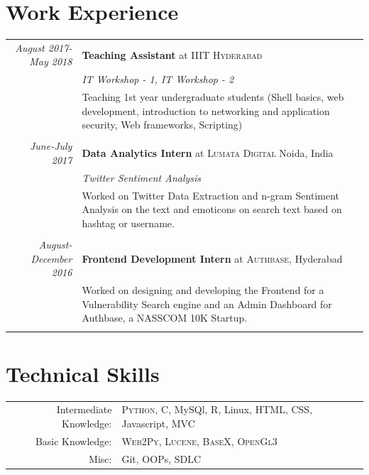 \documentclass[a4paper,10pt]{article}
\begin{document}
\section{Work Experience}
\begin{tabular}{r|p{11cm}}


 \emph{August 2017-May 2018} & \textbf{Teaching Assistant} at \textsc{IIIT Hyderabad} \\\textsc{}&\emph{IT Workshop - 1, IT Workshop - 2}\\&\footnotesize{Teaching 1st year undergraduate students (Shell basics, web
development, introduction to networking and application security, Web frameworks, Scripting)}\\\multicolumn{2}{c}{} \\
 

 \emph{June-July 2017} &\textbf{ Data Analytics Intern} at \textsc{Lumata Digital} Noida, India \\\textsc{}&\emph{Twitter Sentiment Analysis}\\&\footnotesize{Worked on Twitter Data Extraction and n-gram Sentiment Analysis on the text and emoticons on search text based on hashtag or username.}\\\multicolumn{2}{c}{} \\
 
 \emph{August-December 2016} &  \textbf{Frontend Development Intern} at \textsc{Authbase}, Hyderabad \\&\footnotesize{ Worked on designing and developing the Frontend for a Vulnerability Search engine and an Admin Dashboard for Authbase, a NASSCOM 10K Startup.}\\\multicolumn{2}{c}{} \\
\end{tabular}






\section{Technical Skills}
\begin{tabular}{rl}
Intermediate Knowledge:& \textsc{Python}, C, MySQl, R, Linux, HTML, CSS, Javascript, MVC\\
Basic Knowledge:& \textsc{Web2Py}, \textsc{Lucene}, \textsc{BaseX},  \textsc{OpenGl3}\\
Misc: &Git, OOPs, SDLC 
 \setmainfont[SmallCapsFont=Fontin-SmallCaps.otf]{Fontin.otf}\\

\end{tabular}
\end{document}
